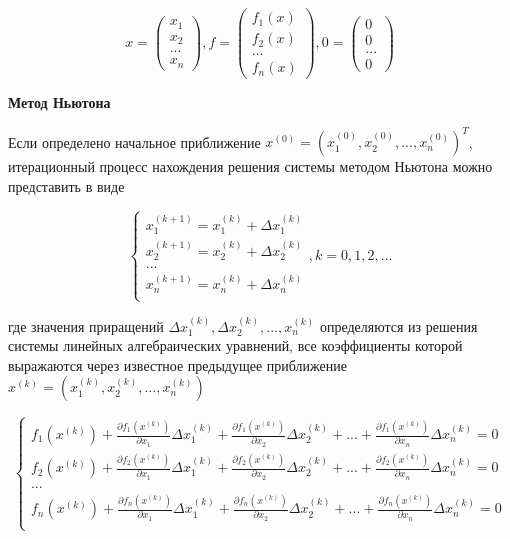 $$
x=\begin{pmatrix}
x_1\\
x_2\\
...\\
x_n
\end{pmatrix},
f=\begin{pmatrix}
f_1(x)\\
f_2(x)\\
...\\
f_n(x)
\end{pmatrix},
0=\begin{pmatrix}
0\\
0\\
...\\
0
\end{pmatrix}
$$

\textbf{Метод Ньютона}

Если определено начальное приближение $x^{(0)}=(x_1^{(0)}, x_2^{(0)}, ..., x_n^{(0)})^T$, итерационный процесс нахождения решения системы методом Ньютона можно представить в виде

$$
\begin{cases}
x_1^{(k+1)}=x_1^{(k)}+ \Delta x_1^{(k)}\\
x_2^{(k+1)}=x_2^{(k)}+ \Delta x_2^{(k)}\\
...\\
x_n^{(k+1)}=x_n^{(k)}+ \Delta x_n^{(k)}\\
\end{cases},
k=0,1,2,...
$$

где значения приращений $\Delta x_1^{(k)}, \Delta x_2^{(k)}, ..., x_n^{(k)}$ определяются из решения системы линейных алгебраических уравнений, все коэффициенты которой выражаются через известное предыдущее приближение $x^{(k)}=(x_1^{(k)}, x_2^{(k)}, ..., x_n^{(k)})$

$$
\begin{cases}
f_1(x^{(k)})+\frac{\partial f_1(x^{(k)})}{\partial x_1} \Delta x_1^{(k)}+\frac{\partial f_1(x^{(k)})}{\partial x_2} \Delta x_2^{(k)}+...+\frac{\partial f_1(x^{(k)})}{\partial x_n} \Delta x_n^{(k)}=0\\
f_2(x^{(k)})+\frac{\partial f_2(x^{(k)})}{\partial x_1} \Delta x_1^{(k)}+\frac{\partial f_2(x^{(k)})}{\partial x_2} \Delta x_2^{(k)}+...+\frac{\partial f_2(x^{(k)})}{\partial x_n} \Delta x_n^{(k)}=0\\
...\\
f_n(x^{(k)})+\frac{\partial f_n(x^{(k)})}{\partial x_1} \Delta x_1^{(k)}+\frac{\partial f_n(x^{(k)})}{\partial x_2} \Delta x_2^{(k)}+...+\frac{\partial f_n(x^{(k)})}{\partial x_n} \Delta x_n^{(k)}=0\\
\end{cases}
$$

